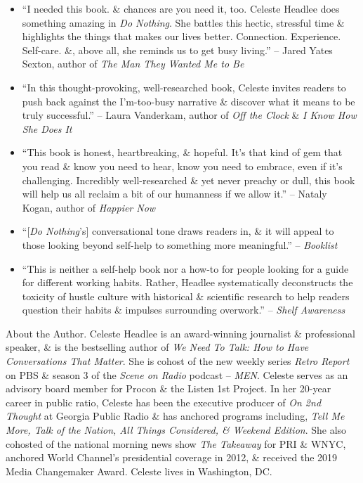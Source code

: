 \documentclass{article}
\begin{document}
\begin{enumerate}
\begin{itemize}
		\item ``I needed this book. \& chances are you need it, too. {\sc Celeste Headlee} does something amazing in {\it Do Nothing}. She battles this hectic, stressful time \& highlights the things that makes our lives better. Connection. Experience. Self-care. \&, above all, she reminds us to get busy living.'' -- {\sc Jared Yates Sexton}, author of {\it The Man They Wanted Me to Be}
		\item ``In this thought-provoking, well-researched book, {\sc Celeste} invites readers to push back against the I'm-too-busy narrative \& discover what it means to be truly successful.'' -- {\sc Laura Vanderkam}, author of {\it Off the Clock} \& {\it I Know How She Does It}
		\item ``This book is honest, heartbreaking, \& hopeful. It's that kind of gem that you read \& know you need to hear, know you need to embrace, even if it's challenging. Incredibly well-researched \& yet never preachy or dull, this book will help us all reclaim a bit of our humanness if we allow it.'' -- {\sc Nataly Kogan}, author of {\it Happier Now}
		\item ``[{\it Do Nothing}'s] conversational tone draws readers in, \& it will appeal to those looking beyond self-help to something more meaningful.'' -- {\it Booklist}
		\item ``This is neither a self-help book nor a how-to for people looking for a guide for different working habits. Rather, {\sc Headlee} systematically deconstructs the toxicity of hustle culture with historical \& scientific research to help readers question their habits \& impulses surrounding overwork.'' -- {\it Shelf Awareness}
	\end{itemize}
	{\sf About the Author.} {\sc Celeste Headlee} is an award-winning journalist \& professional speaker, \& is the bestselling author of {\it We Need To Talk: How to Have Conversations That Matter}. She is cohost of the new weekly series {\it Retro Report} on PBS \& season 3 of the {\it Scene on Radio} podcast -- {\it MEN}. {\sc Celeste} serves as an advisory board member for Procon \& the Listen 1st Project. In her 20-year career in public ratio, {\sc Celeste} has been the executive producer of {\it On 2nd Thought} at Georgia Public Radio \& has anchored programs including, {\it Tell Me More, Talk of the Nation, All Things Considered, \& Weekend Edition}. She also cohosted of the national morning news show {\it The Takeaway} for PRI \& WNYC, anchored World Channel's presidential coverage in 2012, \& received the 2019 Media Changemaker Award. {\sc Celeste} lives in Washington, DC.


\end{enumerate}
\end{document}
